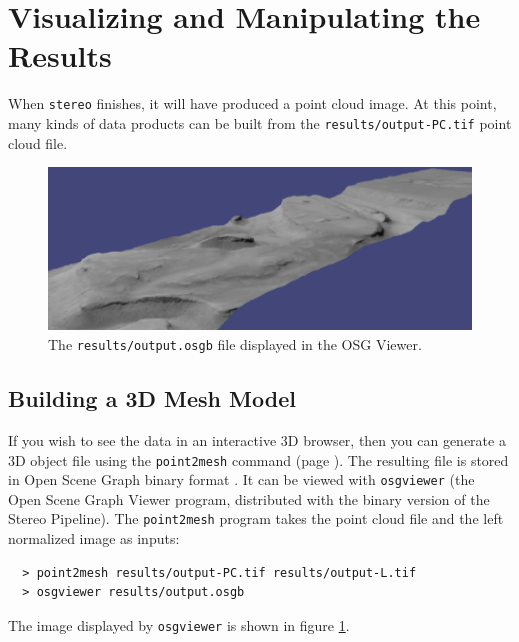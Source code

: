 \section{Visualizing and Manipulating the Results}
\label{visualising}

When \texttt{stereo} finishes, it will have produced a point cloud
image. At this point, many kinds of data products can be built from
the \texttt{results/output-PC.tif} point cloud file.

\begin{figure}[h!]
\begin{minipage}{5in}
\includegraphics[width=5in]{images/p19-osg_400px.png}
\end{minipage}
\hfill
\begin{minipage}{1.7in}
\caption[P19 in OSG]{
    \label{p19-osg}
	The \texttt{results/output.osgb} file displayed in the OSG
        Viewer.}
\end{minipage}
\end{figure}

\subsection{Building a 3D Mesh Model}
If you wish to see the data in an interactive 3D browser, then you can
generate a 3D object file using the \texttt{point2mesh} command (page
\pageref{point2mesh}). The resulting file is stored in Open Scene
Graph binary format \cite{OSG_website}.  It can be viewed with
\texttt{osgviewer} (the Open Scene Graph Viewer program, distributed
with the binary version of the Stereo Pipeline).  The
\texttt{point2mesh} program takes the point cloud file and the left
normalized image as inputs:

\begin{verbatim}
  > point2mesh results/output-PC.tif results/output-L.tif
  > osgviewer results/output.osgb
\end{verbatim}

The image displayed by \texttt{osgviewer} is shown in figure \ref{p19-osg}.

